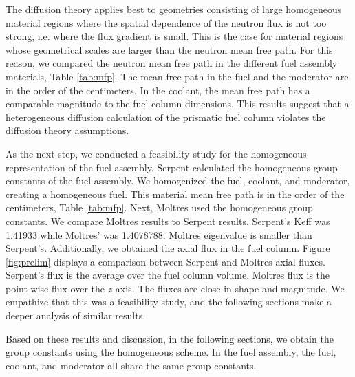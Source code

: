\documentclass[11pt,letterpaper]{article}
\begin{document}
The diffusion theory applies best to geometries consisting of large homogeneous material regions where the spatial dependence of the neutron flux is not too strong, i.e. where the flux gradient is small.
This is the case for material regions whose geometrical scales are larger than the neutron mean free path.
For this reason, we compared the neutron mean free path in the different fuel assembly materials, Table \ref{tab:mfp}.
The mean free path in the fuel and the moderator are in the order of the centimeters.
In the coolant, the mean free path has a comparable magnitude to the fuel column dimensions.
This results suggest that a heterogeneous diffusion calculation of the prismatic fuel column violates the diffusion theory assumptions.

As the next step, we conducted a feasibility study for the homogeneous representation of the fuel assembly.
Serpent calculated the homogeneous group constants of the fuel assembly.
We homogenized the fuel, coolant, and moderator, creating a homogeneous fuel.
This material mean free path is in the order of the centimeters, Table \ref{tab:mfp}.
Next, Moltres used the homogeneous group constants.
We compare Moltres results to Serpent results.
Serpent's \gls{Keff} was 1.41933 while Moltres' was 1.4078788.
Moltres eigenvalue is smaller than Serpent's.
Additionally, we obtained the axial flux in the fuel column.
Figure \ref{fig:prelim} displays a comparison between Serpent and Moltres axial fluxes.
Serpent's flux is the average over the fuel column volume.
Moltres flux is the point-wise flux over the $z$-axis.
The fluxes are close in shape and magnitude.
We empathize that this was a feasibility study, and the following sections make a deeper analysis of similar results.

Based on these results and discussion, in the following sections, we obtain the group constants using the homogeneous scheme.
In the fuel assembly, the fuel, coolant, and moderator all share the same group constants.

\end{document}
